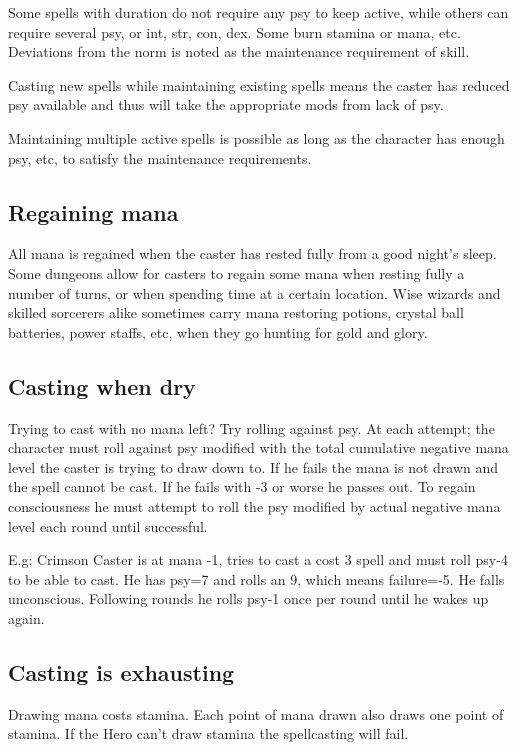 Some spells with duration do not require any psy to keep active, while others can require several psy, or int, str, con, dex. Some burn stamina or mana, etc.
Deviations from the norm is noted as the maintenance requirement of skill.

Casting new spells while maintaining existing spells means the caster has reduced psy available and thus will take the appropriate mods from lack of psy.

Maintaining multiple active spells is possible as long as the character has enough psy, etc, to satisfy the maintenance requirements.


\subsection*{Regaining mana}
All mana is regained when the caster has rested fully from a good night's sleep. Some dungeons allow for casters to regain some mana when resting fully a number of turns, or when spending time at a certain location.
Wise wizards and skilled sorcerers alike sometimes carry mana restoring potions, crystal ball batteries, power staffs, etc, when they go hunting for gold and glory.


\subsection*{Casting when dry}
Trying to cast with no mana left? Try rolling against psy. At each attempt; the character must roll against psy modified with the total cumulative negative mana level the caster is trying to draw down to. If he fails the mana is not drawn and the spell cannot be cast. If he fails with -3 or worse he passes out. To regain consciousness he must attempt to roll the psy modified by actual negative mana level each round until successful.

E.g: Crimson Caster is at mana -1, tries to cast a cost 3 spell and must roll psy-4 to be able to cast. He has psy=7 and rolls an 9, which means failure=-5. He falls unconscious. Following rounds he rolls psy-1 once per round until he wakes up again.


\subsection*{Casting is exhausting}
Drawing mana costs stamina. Each point of mana drawn also draws one point of stamina. If the Hero can't draw stamina the spellcasting will fail.


